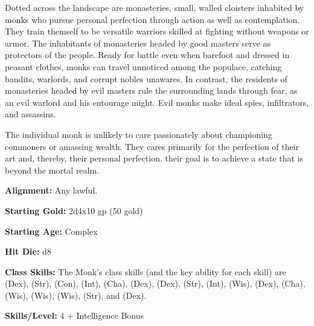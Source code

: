 
Dotted across the landscape are monasteries, small, walled cloisters inhabited by monks who pursue personal perfection through action as well as contemplation. They train themself to be versatile warriors skilled at fighting without weapons or armor. The inhabitants of monasteries headed by good masters serve as protectors of the people. Ready for battle even when barefoot and dressed in peasant clothes, monks can travel unnoticed among the populace, catching bandits, warlords, and corrupt nobles unawares. In contrast, the residents of monasteries headed by evil masters rule the surrounding lands through fear, as an evil warlord and his entourage might. Evil monks make ideal spies, infiltrators, and assassins.

The individual monk is unlikely to care passionately about championing commoners or amassing wealth. They cares primarily for the perfection of their art and, thereby, their personal perfection. their goal is to achieve a state that is beyond the mortal realm.

\textbf{Alignment:} Any lawful.

\textbf{Starting Gold:} 2d4x10 gp (50 gold)

\textbf{Starting Age:} Complex

\textbf{Hit Die:} d8

\textbf{Class Skills:} The Monk's class skills (and the key ability for each skill) are  (Dex),  (Str),  (Con),  (Int),  (Cha),  (Dex),  (Dex),  (Str),  (Int),  (Wis),  (Dex),  (Cha),  (Wis),  (Wis),  (Wis),  (Str), and  (Dex).

\textbf{Skills/Level:} 4 + Intelligence Bonus

\goodbab{}
\poorfor{}
\poorref{}
\goodwil{}

